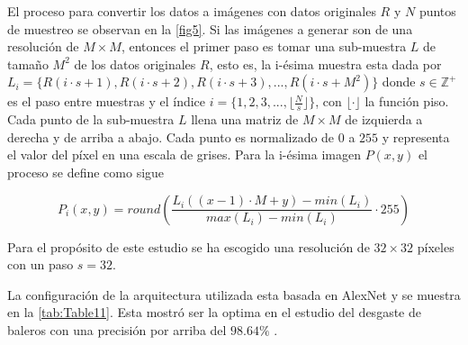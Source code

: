 El proceso para convertir los datos a imágenes con datos originales $R$ y $N$ puntos de muestreo se observan en la \autoref{fig5}.  Si las imágenes a generar son de una resolución de $M \times M$, entonces el primer paso es tomar una sub-muestra $L$ de tamaño $M^2$ de los datos originales $R$, esto es, la i-ésima muestra esta dada por $L_i = \{R(i\cdot s+1),R(i\cdot s+2),R(i\cdot s+3),...,R(i\cdot s+M^2)\}$ donde $s\in \mathbb{Z}^+$ es el paso entre muestras y el índice $i = \{1,2,3,...,  \lfloor\frac{N}{s}\rfloor\}$, con $\lfloor \cdot \rfloor$ la función piso. Cada punto de la sub-muestra $L$ llena una matriz de $M\times M$ de izquierda a derecha y de arriba a abajo. Cada punto es normalizado de $0$ a $255$ y representa el valor del píxel en una escala de grises. Para la i-ésima imagen $P(x,y)$ el proceso se define como sigue

\[ P_i(x,y) =  round\left(\frac{L_i((x-1)\cdot M+y)-min(L_i)}{max(L_i)-min(L_i)}\cdot 255\right)\]

Para el propósito de este estudio se ha escogido una resolución de $32\times 32$ píxeles con un paso $s = 32$.    

La configuración de la arquitectura utilizada esta basada en AlexNet y se muestra en la \autoref{tab:Table11}. Esta mostró ser la optima en el estudio del desgaste de baleros con una precisión por arriba del $98.64\%$ \cite{pinedo-sanchezVibrationAnalysisBearings2020}. 

